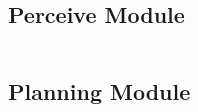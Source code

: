 \documentclass[manuscript,review,anonymous]{acmart}
\begin{document}

\subsection{Perceive Module}
\inputminted[breaklines, breaksymbol={},breakanywhere]{markdown}{prompts/perceive.txt}
\subsection{Planning Module}
\inputminted[breaklines, breaksymbol={},breakanywhere]{markdown}{prompts/planning.txt}
\end{document}

